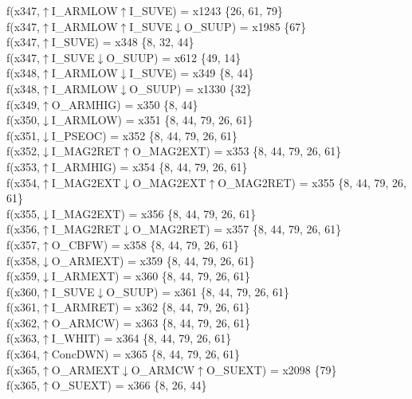 f(x347,$\uparrow$I\_ARMLOW$\uparrow$I\_SUVE) = x1243 \{26, 61, 79\} \\  
f(x347,$\uparrow$I\_ARMLOW$\uparrow$I\_SUVE$\downarrow$O\_SUUP) = x1985 \{67\} \\  
f(x347,$\uparrow$I\_SUVE) = x348 \{8, 32, 44\} \\  
f(x347,$\uparrow$I\_SUVE$\downarrow$O\_SUUP) = x612 \{49, 14\} \\  
f(x348,$\uparrow$I\_ARMLOW$\downarrow$I\_SUVE) = x349 \{8, 44\} \\  
f(x348,$\uparrow$I\_ARMLOW$\downarrow$O\_SUUP) = x1330 \{32\} \\  
f(x349,$\uparrow$O\_ARMHIG) = x350 \{8, 44\} \\  
f(x350,$\downarrow$I\_ARMLOW) = x351 \{8, 44, 79, 26, 61\} \\  
f(x351,$\downarrow$I\_PSEOC) = x352 \{8, 44, 79, 26, 61\} \\  
f(x352,$\downarrow$I\_MAG2RET$\uparrow$O\_MAG2EXT) = x353 \{8, 44, 79, 26, 61\} \\  
f(x353,$\uparrow$I\_ARMHIG) = x354 \{8, 44, 79, 26, 61\} \\  
f(x354,$\uparrow$I\_MAG2EXT$\downarrow$O\_MAG2EXT$\uparrow$O\_MAG2RET) = x355 \{8, 44, 79, 26, 61\} \\  
f(x355,$\downarrow$I\_MAG2EXT) = x356 \{8, 44, 79, 26, 61\} \\  
f(x356,$\uparrow$I\_MAG2RET$\downarrow$O\_MAG2RET) = x357 \{8, 44, 79, 26, 61\} \\  
f(x357,$\uparrow$O\_CBFW) = x358 \{8, 44, 79, 26, 61\} \\  
f(x358,$\downarrow$O\_ARMEXT) = x359 \{8, 44, 79, 26, 61\} \\  
f(x359,$\downarrow$I\_ARMEXT) = x360 \{8, 44, 79, 26, 61\} \\  
f(x360,$\uparrow$I\_SUVE$\downarrow$O\_SUUP) = x361 \{8, 44, 79, 26, 61\} \\  
f(x361,$\uparrow$I\_ARMRET) = x362 \{8, 44, 79, 26, 61\} \\  
f(x362,$\uparrow$O\_ARMCW) = x363 \{8, 44, 79, 26, 61\} \\  
f(x363,$\uparrow$I\_WHIT) = x364 \{8, 44, 79, 26, 61\} \\  
f(x364,$\uparrow$ConcDWN) = x365 \{8, 44, 79, 26, 61\} \\  
f(x365,$\uparrow$O\_ARMEXT$\downarrow$O\_ARMCW$\uparrow$O\_SUEXT) = x2098 \{79\} \\  
f(x365,$\uparrow$O\_SUEXT) = x366 \{8, 26, 44\} \\  
